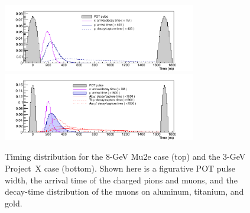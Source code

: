 


\begin{figure}[htb]
  \centering
  \includegraphics[width=0.75\textwidth]{ChargedLeptons/Figures/muon_fullCycle_Al_8GeV_Alt.pdf}
  \includegraphics[width=0.75\textwidth]{ChargedLeptons/Figures/muon_fullCycle_AlTiAu_3GeV_Alt.pdf}
  \caption{Timing distribution for the 8-GeV Mu2e case (top) and the 3-GeV Project~X case (bottom).  Shown
  here is a figurative POT pulse width, the arrival time of the
  charged pions and muons, and the decay-time distribution of the
  muons on aluminum, titanium, and gold.}
  \label{cl:fig:timing}
\end{figure}


